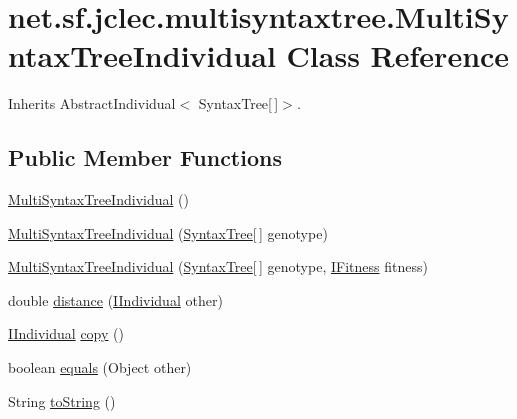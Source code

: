 \hypertarget{classnet_1_1sf_1_1jclec_1_1multisyntaxtree_1_1_multi_syntax_tree_individual}{\section{net.\-sf.\-jclec.\-multisyntaxtree.\-Multi\-Syntax\-Tree\-Individual Class Reference}
\label{classnet_1_1sf_1_1jclec_1_1multisyntaxtree_1_1_multi_syntax_tree_individual}
}


Inherits Abstract\-Individual$<$ Syntax\-Tree\mbox{[}$\,$\mbox{]}$>$.

\subsection*{Public Member Functions}
\begin{DoxyCompactItemize}
\item 
\hyperlink{classnet_1_1sf_1_1jclec_1_1multisyntaxtree_1_1_multi_syntax_tree_individual_a912762b8dbce96191d660e78be1d362d}{Multi\-Syntax\-Tree\-Individual} ()
\item 
\hyperlink{classnet_1_1sf_1_1jclec_1_1multisyntaxtree_1_1_multi_syntax_tree_individual_a8b777224948f1f7e5cb85e1aea0ec5c6}{Multi\-Syntax\-Tree\-Individual} (\hyperlink{classnet_1_1sf_1_1jclec_1_1syntaxtree_1_1_syntax_tree}{Syntax\-Tree}\mbox{[}$\,$\mbox{]} genotype)
\item 
\hyperlink{classnet_1_1sf_1_1jclec_1_1multisyntaxtree_1_1_multi_syntax_tree_individual_a73f9e0c0b01e1ed7a6b09ce9e84b06db}{Multi\-Syntax\-Tree\-Individual} (\hyperlink{classnet_1_1sf_1_1jclec_1_1syntaxtree_1_1_syntax_tree}{Syntax\-Tree}\mbox{[}$\,$\mbox{]} genotype, \hyperlink{interfacenet_1_1sf_1_1jclec_1_1_i_fitness}{I\-Fitness} fitness)
\item 
double \hyperlink{classnet_1_1sf_1_1jclec_1_1multisyntaxtree_1_1_multi_syntax_tree_individual_a4d0ce238c83098d8ce12427466d93501}{distance} (\hyperlink{interfacenet_1_1sf_1_1jclec_1_1_i_individual}{I\-Individual} other)
\item 
\hyperlink{interfacenet_1_1sf_1_1jclec_1_1_i_individual}{I\-Individual} \hyperlink{classnet_1_1sf_1_1jclec_1_1multisyntaxtree_1_1_multi_syntax_tree_individual_a212670024ba0d8a78f554228d958ab1c}{copy} ()
\item 
boolean \hyperlink{classnet_1_1sf_1_1jclec_1_1multisyntaxtree_1_1_multi_syntax_tree_individual_af5b464618921120f855a12215d287ec7}{equals} (Object other)
\item 
String \hyperlink{classnet_1_1sf_1_1jclec_1_1multisyntaxtree_1_1_multi_syntax_tree_individual_a09427a1c93b008fffa28026bece1a00d}{to\-String} ()
\end{DoxyCompactItemize}


